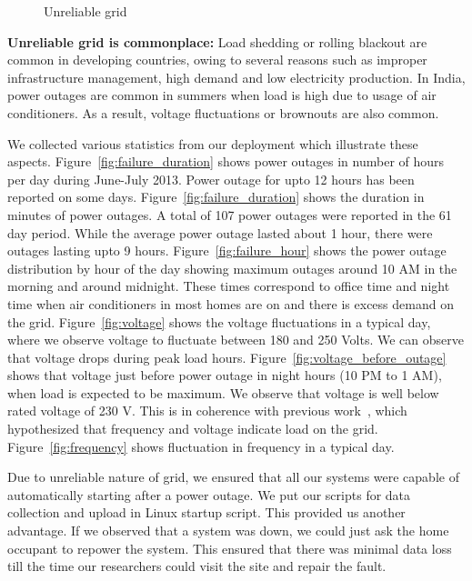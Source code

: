 \documentclass[10pt]{sensys-proc}
\newcommand{\figref}[1]{Figure~\ref{#1}}
\begin{document}
\begin{figure}[t!]
     \vspace{-3mm}
   
    \caption{Unreliable grid}

    \label{fig:unreliable}

\end{figure}
\noindent \textbf{Unreliable grid is commonplace:} Load shedding or rolling blackout are common in developing countries, owing to several reasons such as improper infrastructure management, high demand and low electricity production. In India, power outages are common in summers when load is high due to usage of air conditioners. As a result, voltage fluctuations or brownouts are also common.

\noindent We collected various statistics from our deployment which illustrate these aspects. \figref{fig:failure_duration} shows power outages in number of hours per day during June-July 2013. Power outage for upto 12 hours has been reported on some days. \figref{fig:failure_duration} shows the duration in minutes of power outages. A total of 107 power outages were reported in the 61 day period. While the average power outage lasted about 1 hour, there were outages lasting upto 9 hours. \figref{fig:failure_hour} shows the power outage distribution by hour of the day showing maximum outages around 10 AM in the morning and around midnight. These times correspond to office time and night time when air conditioners in most homes are on and there is excess demand on the grid. \figref{fig:voltage} shows the voltage fluctuations in a typical day, where we observe voltage to fluctuate between 180 and 250 Volts. We can observe that voltage drops during peak load hours. \figref{fig:voltage_before_outage} shows that voltage just before power outage in night hours (10 PM to 1 AM), when load is expected to be maximum. We observe that voltage is well below rated voltage of 230 V. This is in coherence with previous work~\cite{nplug}, which hypothesized that frequency and voltage indicate load on the grid. \figref{fig:frequency} shows fluctuation in frequency in a typical day.

\noindent Due to unreliable nature of grid, we ensured that all our systems were capable of automatically starting after a power outage. We put our scripts for data collection and upload in Linux startup script. This provided us another advantage. If we observed that a system was down, we could just ask the home occupant to repower the system. This ensured that there was minimal data loss till the time our researchers could visit the site and repair the fault.
\end{document}
